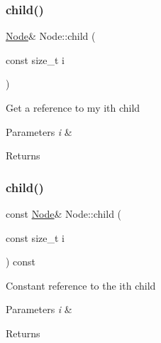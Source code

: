 \mbox{\label{class_node_a23adfa03c20f4141b1105c5b4b1bca3f}} 
\subsubsection{\texorpdfstring{child()}{child()}\hspace{0.1cm}{\footnotesize\ttfamily [1/2]}}
{\footnotesize\ttfamily \hyperlink{class_node}{Node}\& Node\+::child (\begin{DoxyParamCaption}\item[{const size\+\_\+t}]{i }\end{DoxyParamCaption})\hspace{0.3cm}{\ttfamily [inline]}}

Get a reference to my i\textquotesingle{}th child 
\begin{DoxyParams}{Parameters}
{\em i} & \\
\hline
\end{DoxyParams}
\begin{DoxyReturn}{Returns}

\end{DoxyReturn}
\mbox{\label{class_node_acc2b20cdba470853f1c137e26546ed3c}} 
\subsubsection{\texorpdfstring{child()}{child()}\hspace{0.1cm}{\footnotesize\ttfamily [2/2]}}
{\footnotesize\ttfamily const \hyperlink{class_node}{Node}\& Node\+::child (\begin{DoxyParamCaption}\item[{const size\+\_\+t}]{i }\end{DoxyParamCaption}) const\hspace{0.3cm}{\ttfamily [inline]}}

Constant reference to the i\textquotesingle{}th child 
\begin{DoxyParams}{Parameters}
{\em i} & \\
\hline
\end{DoxyParams}
\begin{DoxyReturn}{Returns}

\end{DoxyReturn}
\mbox{\label{class_node_abd387b27e1deb45b789ad7b7abd8c6e6}} 
